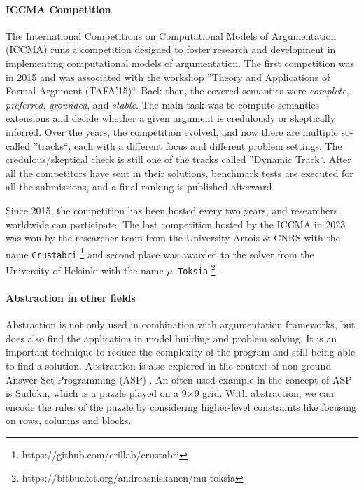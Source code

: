 \paragraph{ICCMA Competition} The International Competitions on Computational Models of Argumentation (ICCMA) runs a competition designed to foster research and development in implementing computational models of argumentation. The first competition was in 2015 and was associated with the workshop ''Theory and Applications of Formal Argument (TAFA'15)``. Back then, the covered semantics were \emph{complete}, \emph{preferred}, \emph{grounded}, and \emph{stable}. The main task was to compute semantics extensions and decide whether a given argument is credulously or skeptically inferred. Over the years, the competition evolved, and now there are multiple so-called ''tracks``, each with a different focus and different problem settings. The credulous/skeptical check is still one of the tracks called ''Dynamic Track``. After all the competitors have sent in their solutions, benchmark tests are executed for all the submissions, and a final ranking is published afterward.

Since 2015, the competition has been hosted every two years, and researchers worldwide can participate. The last competition hosted by the ICCMA in 2023 was won by the researcher team from the University Artois \& CNRS with the name \texttt{Crustabri} \footnote{https://github.com/crillab/crustabri} and second place was awarded to the solver from the University of Helsinki with the name \texttt{$\mu$-Toksia} \footnote{https://bitbucket.org/andreasniskanen/mu-toksia} \cite{DBLP:conf/kr/NiskanenJ20a}.


\paragraph{Abstraction in other fields} Abstraction is not only used in combination with argumentation frameworks, but does also find the application in model building and problem solving. It is an important technique to reduce the complexity of the program and still being able to find a solution. Abstraction is also explored in the context of non-ground Answer Set Programming (ASP) \cite{inproceedingsBesnardDoutreBooleanFormulaSemantics}. An often used example in the concept of ASP is Sudoku, which is a puzzle played on a 9$\times$9 grid. With abstraction, we can encode the rules of the puzzle by considering higher-level constraints like focusing on rows, columns and blocks.

